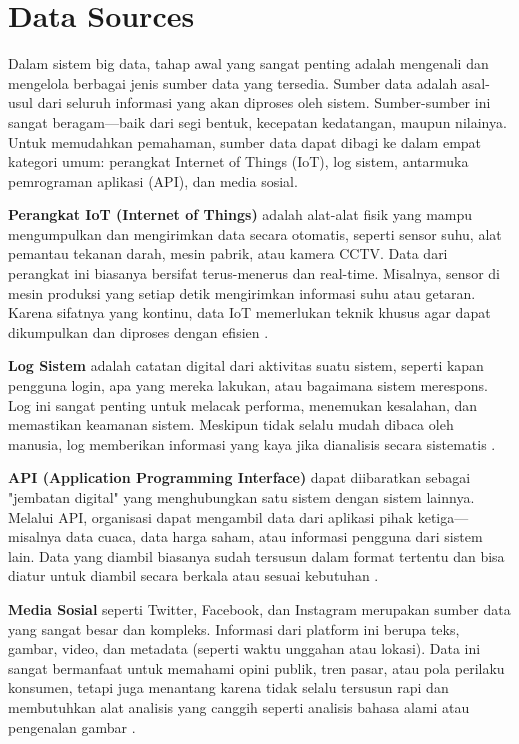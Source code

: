 \section{Data Sources}

Dalam sistem big data, tahap awal yang sangat penting adalah mengenali dan mengelola berbagai jenis sumber data yang tersedia. Sumber data adalah asal-usul dari seluruh informasi yang akan diproses oleh sistem. Sumber-sumber ini sangat beragam—baik dari segi bentuk, kecepatan kedatangan, maupun nilainya. Untuk memudahkan pemahaman, sumber data dapat dibagi ke dalam empat kategori umum: perangkat Internet of Things (IoT), log sistem, antarmuka pemrograman aplikasi (API), dan media sosial.

\textbf{Perangkat IoT (Internet of Things)} adalah alat-alat fisik yang mampu mengumpulkan dan mengirimkan data secara otomatis, seperti sensor suhu, alat pemantau tekanan darah, mesin pabrik, atau kamera CCTV. Data dari perangkat ini biasanya bersifat terus-menerus dan real-time. Misalnya, sensor di mesin produksi yang setiap detik mengirimkan informasi suhu atau getaran. Karena sifatnya yang kontinu, data IoT memerlukan teknik khusus agar dapat dikumpulkan dan diproses dengan efisien \cite{gubbi2013internet}.

\textbf{Log Sistem} adalah catatan digital dari aktivitas suatu sistem, seperti kapan pengguna login, apa yang mereka lakukan, atau bagaimana sistem merespons. Log ini sangat penting untuk melacak performa, menemukan kesalahan, dan memastikan keamanan sistem. Meskipun tidak selalu mudah dibaca oleh manusia, log memberikan informasi yang kaya jika dianalisis secara sistematis \cite{xu2009detecting}.

\textbf{API (Application Programming Interface)} dapat diibaratkan sebagai "jembatan digital" yang menghubungkan satu sistem dengan sistem lainnya. Melalui API, organisasi dapat mengambil data dari aplikasi pihak ketiga—misalnya data cuaca, data harga saham, atau informasi pengguna dari sistem lain. Data yang diambil biasanya sudah tersusun dalam format tertentu dan bisa diatur untuk diambil secara berkala atau sesuai kebutuhan \cite{fielding2000architectural}.

\textbf{Media Sosial} seperti Twitter, Facebook, dan Instagram merupakan sumber data yang sangat besar dan kompleks. Informasi dari platform ini berupa teks, gambar, video, dan metadata (seperti waktu unggahan atau lokasi). Data ini sangat bermanfaat untuk memahami opini publik, tren pasar, atau pola perilaku konsumen, tetapi juga menantang karena tidak selalu tersusun rapi dan membutuhkan alat analisis yang canggih seperti analisis bahasa alami atau pengenalan gambar \cite{alam2017twitter}.

